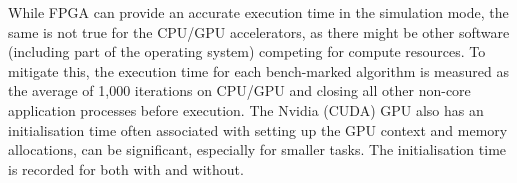 While FPGA can provide an accurate execution time in the simulation mode, the same is not true for the CPU/GPU accelerators, as there might be other software (including part of the operating system) competing for compute resources. To mitigate this, the execution time for each bench-marked algorithm is measured as the average of 1,000 iterations on CPU/GPU and closing all other non-core application processes before execution. The Nvidia (CUDA) GPU also has an initialisation time often associated with setting up the GPU context and memory allocations, can be significant, especially for smaller tasks. The initialisation time is recorded for both with and without.




